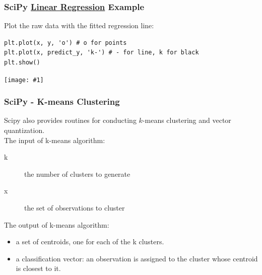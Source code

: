 \documentclass[xcolor=svgnames]{beamer}
\newcommand{\nl}{\\[1em]}
\newcommand{\ipic}[2]{\texttt{[image: \#1]}}
\newcommand{\ft}[1]{\frametitle{#1}}
\begin{document}
\begin{frame}[fragile]\ft{SciPy \href{https://docs.scipy.org/doc/scipy/reference/generated/scipy.stats.linregress.html}{Linear Regression} Example}
Plot the raw data with the fitted regression line:
\begin{Verbatim}[xleftmargin=-.1in, fontsize=\small, commandchars=\\\{\}, frame=single] 
plt.plot(x, y, 'o') # o for points
plt.plot(x, predict_y, 'k-') # - for line, k for black
plt.show()
\end{Verbatim}
\begin{center}
\ipic{LR}{0.7}
\end{center}
\end{frame}

\begin{frame}
[fragile]\ft{SciPy - K-means Clustering}


Scipy also provides routines for conducting $k$-means clustering and vector quantization.\nl

The input of k-means algorithm:
\begin{description}
\item[k] the number of clusters to generate
\item[x] the set of observations to cluster
\end{description}
The output of k-means algorithm: 
\begin{itemize}
\item a set of centroids, one for each of the k clusters.
\item  a classification vector:  an observation is assigned to the cluster whose centroid is closest to it.
\end{itemize}
\end{frame}
\end{document}
